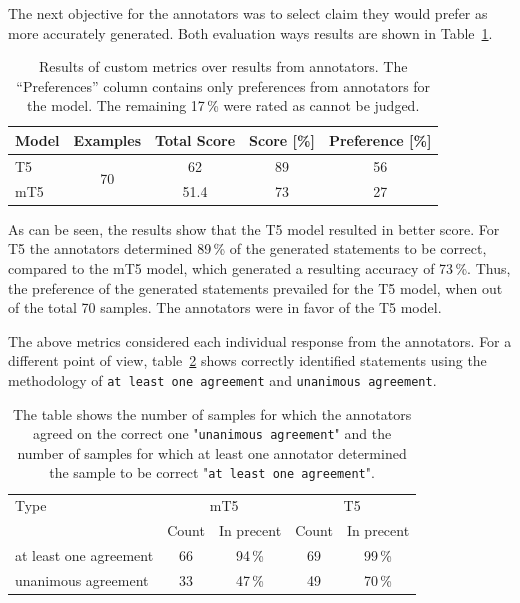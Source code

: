 
The next objective for the annotators was to select claim they would prefer as more accurately generated. Both evaluation ways results are shown in Table~\ref{tab:total_score}.

\begin{table}[H]
    \centering
    \begin{tabular}{l|cccc}
        \hline
        Model & Examples & Total Score & Score [\%] & Preference [\%] \\
        \hline
        T5 & \multirow{2}{*}{70} & 62 & 89 & 56 \\
        mT5 & & 51.4 & 73 & 27\\
        \hline
    \end{tabular}
    \caption{Results of custom metrics over results from annotators. The ``Preferences'' column contains only preferences from annotators for the model. The remaining 17\,\% were rated as cannot be judged.}
    \label{tab:total_score}
\end{table}


As can be seen, the results show that the T5 model resulted in better score. For T5 the annotators determined 89\,\% of the generated statements to be correct, compared to the mT5 model, which generated a resulting accuracy of 73\,\%. Thus, the preference of the generated statements prevailed for the T5 model, when out of the total 70 samples. The annotators were in favor of the T5 model.

The above metrics considered each individual response from the annotators. For a different point of view, table~\ref{tab:agreement} shows correctly identified statements using the methodology of \texttt{at least one agreement} and \texttt{unanimous agreement}.

\begin{table}[H]
    \centering
    \begin{tabular}{l|cccc}
        \hline
        Type & \multicolumn{2}{c}{mT5} & \multicolumn{2}{c}{T5} \\
         & Count & In precent & Count & In precent \\
        \hline
        at least one agreement & 66 & 94\,\% & 69 & 99\,\% \\
        unanimous agreement & 33 & 47\,\% & 49 & 70\,\% \\
        \hline
    \end{tabular}
    \caption{The table shows the number of samples for which the annotators agreed on the correct one "\texttt{unanimous agreement}" and the number of samples for which at least one annotator determined the sample to be correct "\texttt{at least one agreement}".}
    \label{tab:agreement}
\end{table}

